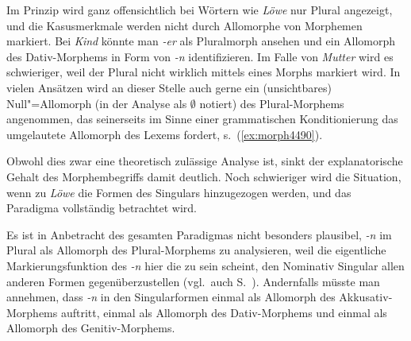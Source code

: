 Im Prinzip wird ganz offensichtlich bei Wörtern wie \textit{Löwe} nur Plural angezeigt, und die Kasusmerkmale werden nicht durch Allomorphe von Morphemen markiert.
Bei \textit{Kind} könnte man \textit{-er} als Pluralmorph ansehen und ein Allomorph des Dativ-Morphems in Form von \textit{-n} identifizieren.
Im Falle von \textit{Mutter} wird es schwieriger, weil der Plural nicht wirklich mittels eines Morphs markiert wird.
In vielen Ansätzen wird an dieser Stelle auch gerne ein (unsichtbares) Null"=Allomorph (in der Analyse \zB als $\emptyset$ notiert) des Plural-Morphems angenommen, das seinerseits im Sinne einer grammatischen Konditionierung das umgelautete Allomorph des Lexems fordert, s.\ (\ref{ex:morph4490}).

\begin{exe}
\end{exe}

Obwohl dies zwar eine theoretisch zulässige Analyse ist, sinkt der explanatorische Gehalt des Morphembegriffs damit deutlich.
Noch schwieriger wird die Situation, wenn zu \textit{Löwe} die Formen des Singulars hinzugezogen werden, und das Paradigma vollständig betrachtet wird.

\begin{exe}
  \ex
  \begin{xlist}
  \end{xlist}
\end{exe}

Es ist in Anbetracht des gesamten Paradigmas nicht besonders plausibel, \textit{-n} im Plural als Allomorph des Plural-Morphems zu analysieren, weil die eigentliche Markierungsfunktion des \textit{-n} hier die zu sein scheint, den Nominativ Singular allen anderen Formen gegenüberzustellen (vgl.\ auch S.~\pageref{abs:4578239547}).
Andernfalls müsste man annehmen, dass \textit{-n} in den Singularformen einmal als Allomorph des Akkusativ-Morphems auftritt, einmal als Allomorph des Dativ-Morphems und einmal als Allomorph des Genitiv-Morphems.


